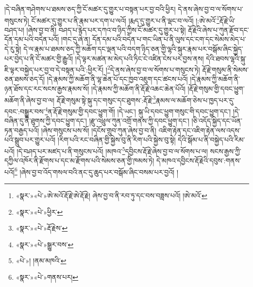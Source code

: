 །དེ་བཞིན་གཤེགས་པ་ཐམས་ཅད་ཀྱི་ངོ་མཚར་དུ་གྱུར་པ་བསྟན་པར་བྱ་བའི་ཕྱིར། དེ་ནས་ཞེས་བྱ་བ་ལ་སོགས་པ་གསུངས་ཏེ། ངོ་མཚར་དུ་གྱུར་པ་ནི་རྣམ་པར་དག་པ་ལའོ། །རྨད་དུ་གྱུར་པ་ནི་ལྡང་བ་ལའོ། །:ཨེ་མའོ་\footnote{«སྣར་»«པེ་»ཨེ་མའོ་རྡོ་རྗེ་ཨེ་རྡོ་རྗེ། ཞེས་བྱ་བ་ནི་རབ་ཏུ་དང་བས་བཟླས་པའོ། །ཨེ་མའོ་}རྡོ་རྗེ་ཡི་བཤད་པ། །ཞེས་བྱ་བ་ནི། བཤད་པ་རྙེད་པར་དཀའ་བ་ཉིད་ཀྱིས་ངོ་མཚར་དུ་གྱུར་པ་སྟེ། རྡོ་རྗེའི་ཞེས་པ་ཀུན་རྫོབ་དང་དོན་དམ་པའི་བདེན་པའོ། །གང་དུ་ཞེ་ན། དོན་དམ་པའི་བདེན་པ་གང་ཡིན་པ་ནི་ལུས་དང་ངག་དང་སེམས་མེད་པ་དེ་རུ་སྟེ། དེ་ལ་རྣམ་པ་ཐམས་ཅད་ཀྱི་མཆོག་དང་ལྡན་པའི་བདག་ཉིད་ཅན་གྱི་ལྷའི་སྐུར་རྣམ་པར་བསྒོམ་ཞིང་སྐྱེད་པར་བྱེད་པ་ནི་ངོ་མཚར་གྱི་རྒྱུའོ། །དེ་ལྟར་མཚན་མ་མེད་པའི་ཏིང་ངེ་འཛིན་ངེས་པར་བྱས་ནས། དེའི་ཐབས་ལྷའི་སྐུ་ཇི་ལྟར་བསྐྱེད་པར་བྱ་བ་དེ་བསྟན་པའི་:ཕྱིར་རོ། །\footnote{«སྣར་»«པེ་»ཕྱིར་}དེ་ནས་ཞེས་བྱ་བ་ལ་སོགས་པ་གསུངས་ཏེ། རྡོ་རྗེ་གསུམ་ནི་སེམས་ཅན་ཐམས་ཅད་དོ། །དེ་རྣམས་ཀྱི་མཆོག་ནི་ལྷ་ཆེན་པོ་དང་ཁྱབ་འཇུག་དང་ཚངས་པའོ། །དེ་རྣམས་ཀྱི་མཆོག་ནི་ཉན་ཐོས་དང་རང་སངས་རྒྱས་རྣམས་སོ། །དེ་རྣམས་ཀྱི་མཆོག་ནི་རྡོ་རྗེ་འཆང་ཆེན་པོའོ། །རྡོ་རྗེ་གསུམ་གྱི་དབང་ཕྱུག་མཆོག་ནི་ཞེས་བྱ་བ་ལ། རྡོ་རྗེ་གསུམ་སྟེ་སྐུ་དང་གསུང་དང་ཐུགས་:རྡོ་རྗེ་\footnote{«སྣར་»«པེ་»རྡོ་རྗེས་}རྣམས་ལ་མཆོག་ཅེས་པ་ཁྱད་པར་དུ་དབང་:བསྒྱུར་བས་\footnote{«སྣར་»«པེ་»སྒྱུར་བས་}ན་རྡོ་རྗེ་གསུམ་གྱི་དབང་ཕྱུག་གོ། །དེ་ཡང་། སྐུ་ཡི་དབང་ཕྱུག་གསུང་གི་དབང་ཕྱུག་དང་། །དེ་བཞིན་དུ་ནི་ཐུགས་ཀྱི་དབང་ཕྱུག་དང་། །རྫུ་འཕྲུལ་ཀུན་འགྲོ་གནས་ཀྱི་དབང་ཕྱུག་དང་། །ཅི་འདོད་སྐྱེད་དང་ཡོན་ཏན་བརྒྱད་པའོ། །ཞེས་གསུངས་པས་སོ། །དངོས་གྲུབ་ཀུན་ཞེས་བྱ་བ་ནི། འཇིག་རྟེན་དང་འཇིག་རྟེན་ལས་འདས་པའི་སྒྲུབ་པར་གྱུར་པའོ། །རིག་པའི་རང་བཞིན་གྱི་སྐྱེས་བུ་ནི་རིག་པའི་སྐྱེས་བུ་སྟེ། དེའི་སྒོམ་པ་ནི་བསྐྱེད་པའི་རིམ་པའོ། །དེ་བཤད་པར་མཛད་པ་ནི་གསུངས་པའོ། །མཁའ་\footnote{«པེ་»། །ནམ་མཁའི་}དབྱིངས་རྡོ་རྗེ་ཞེས་བྱ་བ་ལ་སོགས་པ་ལ། སངས་རྒྱས་ཀྱི་དཀྱིལ་འཁོར་ནི་རྫོགས་པ་དང་མ་རྫོགས་པའི་སེམས་ཅན་གྱི་ཁམས་ཏེ། དེ་མཁའ་དབྱིངས་རྡོ་རྗེའི་དབུས་:གནས་པའོ།\footnote{«སྣར་»«པེ་»གནས་པར།} །ཞེས་བྱ་བ་འོད་གསལ་བའི་ནང་དུ་ཆུད་པར་བསྒོམ་ཞིང་བསམ་པར་བྱའོ། །
